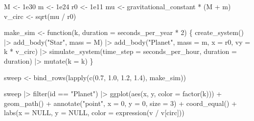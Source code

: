 \documentclass[
  10.5pt,
  letterpaper,
]{scrbook}
\newenvironment{Shaded}{\begin{snugshade}}{\end{snugshade}}
\newcommand{\AttributeTok}[1]{\textcolor[rgb]{0.00,0.00,0.00}{#1}}
\newcommand{\ConstantTok}[1]{\textcolor[rgb]{0.00,0.00,0.00}{#1}}
\newcommand{\ControlFlowTok}[1]{\textcolor[rgb]{0.00,0.00,0.00}{#1}}
\newcommand{\DecValTok}[1]{\textcolor[rgb]{0.00,0.00,0.00}{#1}}
\newcommand{\FloatTok}[1]{\textcolor[rgb]{0.00,0.00,0.00}{#1}}
\newcommand{\FunctionTok}[1]{\textcolor[rgb]{0.00,0.00,0.00}{#1}}
\newcommand{\NormalTok}[1]{\textcolor[rgb]{0.00,0.00,0.00}{#1}}
\newcommand{\OtherTok}[1]{\textcolor[rgb]{0.00,0.00,0.00}{#1}}
\newcommand{\SpecialCharTok}[1]{\textcolor[rgb]{0.00,0.00,0.00}{#1}}
\newcommand{\StringTok}[1]{\textcolor[rgb]{0.00,0.00,0.00}{#1}}
\theoremstyle{definition}
\theoremstyle{plain}
\theoremstyle{remark}
\begin{document}
\begin{Shaded}
\begin{Highlighting}[]
\NormalTok{M  }\OtherTok{\textless{}{-}} \FloatTok{1e30}
\NormalTok{m  }\OtherTok{\textless{}{-}} \FloatTok{1e24}
\NormalTok{r0 }\OtherTok{\textless{}{-}} \FloatTok{1e11}
\NormalTok{mu }\OtherTok{\textless{}{-}}\NormalTok{ gravitational\_constant }\SpecialCharTok{*}\NormalTok{ (M }\SpecialCharTok{+}\NormalTok{ m)}
\NormalTok{v\_circ }\OtherTok{\textless{}{-}} \FunctionTok{sqrt}\NormalTok{(mu }\SpecialCharTok{/}\NormalTok{ r0)}

\NormalTok{make\_sim }\OtherTok{\textless{}{-}} \ControlFlowTok{function}\NormalTok{(k, }\AttributeTok{duration =}\NormalTok{ seconds\_per\_year }\SpecialCharTok{*} \DecValTok{2}\NormalTok{) \{}
  \FunctionTok{create\_system}\NormalTok{() }\SpecialCharTok{|\textgreater{}}
    \FunctionTok{add\_body}\NormalTok{(}\StringTok{"Star"}\NormalTok{,   }\AttributeTok{mass =}\NormalTok{ M) }\SpecialCharTok{|\textgreater{}}
    \FunctionTok{add\_body}\NormalTok{(}\StringTok{"Planet"}\NormalTok{, }\AttributeTok{mass =}\NormalTok{ m, }\AttributeTok{x =}\NormalTok{ r0, }\AttributeTok{vy =}\NormalTok{ k }\SpecialCharTok{*}\NormalTok{ v\_circ) }\SpecialCharTok{|\textgreater{}}
    \FunctionTok{simulate\_system}\NormalTok{(}\AttributeTok{time\_step =}\NormalTok{ seconds\_per\_hour, }\AttributeTok{duration =}\NormalTok{ duration) }\SpecialCharTok{|\textgreater{}}
    \FunctionTok{mutate}\NormalTok{(}\AttributeTok{k =}\NormalTok{ k)}
\NormalTok{\}}

\NormalTok{sweep }\OtherTok{\textless{}{-}} \FunctionTok{bind\_rows}\NormalTok{(}\FunctionTok{lapply}\NormalTok{(}\FunctionTok{c}\NormalTok{(}\FloatTok{0.7}\NormalTok{, }\FloatTok{1.0}\NormalTok{, }\FloatTok{1.2}\NormalTok{, }\FloatTok{1.4}\NormalTok{), make\_sim))}
\end{Highlighting}
\end{Shaded}

\begin{Shaded}
\begin{Highlighting}[]
\NormalTok{sweep }\SpecialCharTok{|\textgreater{}}
  \FunctionTok{filter}\NormalTok{(id }\SpecialCharTok{==} \StringTok{"Planet"}\NormalTok{) }\SpecialCharTok{|\textgreater{}}
  \FunctionTok{ggplot}\NormalTok{(}\FunctionTok{aes}\NormalTok{(x, y, }\AttributeTok{color =} \FunctionTok{factor}\NormalTok{(k))) }\SpecialCharTok{+}
  \FunctionTok{geom\_path}\NormalTok{() }\SpecialCharTok{+}
  \FunctionTok{annotate}\NormalTok{(}\StringTok{"point"}\NormalTok{, }\AttributeTok{x =} \DecValTok{0}\NormalTok{, }\AttributeTok{y =} \DecValTok{0}\NormalTok{, }\AttributeTok{size =} \DecValTok{3}\NormalTok{) }\SpecialCharTok{+}
  \FunctionTok{coord\_equal}\NormalTok{() }\SpecialCharTok{+}
  \FunctionTok{labs}\NormalTok{(}\AttributeTok{x =} \ConstantTok{NULL}\NormalTok{, }\AttributeTok{y =} \ConstantTok{NULL}\NormalTok{, }\AttributeTok{color =} \FunctionTok{expression}\NormalTok{(v }\SpecialCharTok{/}\NormalTok{ v[circ]))}
\end{Highlighting}
\end{Shaded}
\end{document}
